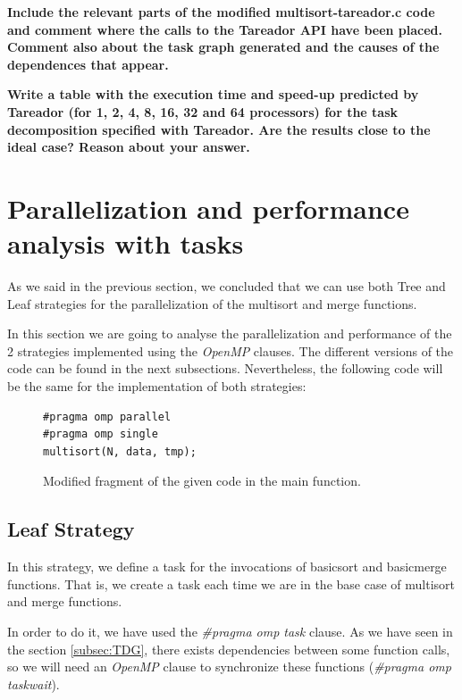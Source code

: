 \documentclass[12pt, a4paper]{article}
\begin{document}
\break

\textbf{Include the relevant parts of the modified multisort-tareador.c code and comment where the
calls to the Tareador API have been placed. Comment also about the task graph generated and
the causes of the dependences that appear.}

\textbf{Write a table with the execution time and speed-up predicted by Tareador (for 1, 2, 4, 8, 16, 32
and 64 processors) for the task decomposition specified with Tareador. Are the results close to the
ideal case? Reason about your answer.}

\section{Parallelization and performance analysis with tasks}

As we said in the previous section, we concluded that we can use both Tree and Leaf strategies for the parallelization of the multisort and merge functions.

In this section we are going to analyse the parallelization and performance of the 2 strategies implemented using the \textit{OpenMP} clauses. The different versions of the code can be found in the next subsections. Nevertheless, the following code will be the same for the implementation of both strategies:

\begin{figure}[H]
\begin{lstlisting}
#pragma omp parallel
#pragma omp single
multisort(N, data, tmp);
\end{lstlisting}

\caption{Modified fragment of the given code in the main function.}
\end{figure}

\subsection{Leaf Strategy}

In this strategy, we define a task for the invocations of basicsort and basicmerge functions. That is, we create a task each time we are in the base case of multisort and merge functions.

In order to do it, we have used the \textit{\#pragma omp task} clause. As we have seen in the section \ref{subsec:TDG}, there exists dependencies between some function calls, so we will need an \textit{OpenMP} clause to synchronize these functions (\textit{\#pragma omp taskwait}).
\end{document}

